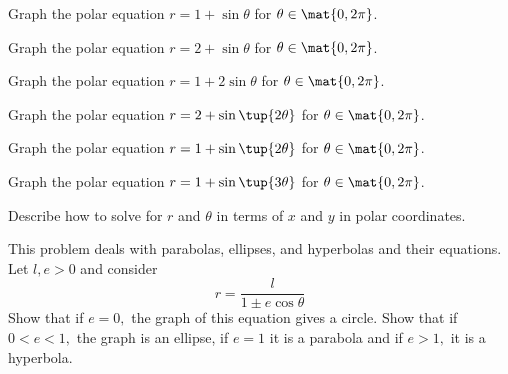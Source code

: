 \begin{enumialphparenastyle}
\begin{ex} Graph the polar equation $r=1+\sin \theta $ for $\theta \in \mat{0,2\pi}$.
\end{ex}

\begin{ex} Graph the polar equation $r=2+\sin \theta $ for $\theta \in \mat{0,2\pi}$.
\end{ex}

\begin{ex} Graph the polar equation $r=1+2\sin \theta $ for $\theta \in \mat{0,2\pi}$.
\end{ex}

\begin{ex} Graph the polar equation $r=2+\sin \tup{2\theta } $ for $\theta \in \mat{0,2\pi 
}$.
\end{ex}

\begin{ex} Graph the polar equation $r=1+\sin \tup{2\theta } $ for $\theta \in \mat{0,2\pi 
}$.
\end{ex}

\begin{ex} Graph the polar equation $r=1+\sin \tup{3\theta } $ for $\theta \in \mat{0,2\pi 
} $.
\end{ex}


\begin{ex} Describe how to solve for $r$ and $\theta $ in terms of $x$ and $y$ in polar
coordinates.
\end{ex}

\begin{ex} This problem deals with parabolas, ellipses, and
hyperbolas and their equations. Let $l,e>0$ and consider
\begin{equation*}
r=\frac{l}{1\pm e\cos \theta }
\end{equation*}
Show that if $e=0,$ the graph of this equation gives a circle. Show that if $0<e<1,$ the graph is an ellipse, if $e=1$
it is a parabola and if $e>1,$ it is a hyperbola.
\end{ex}

\end{enumialphparenastyle}